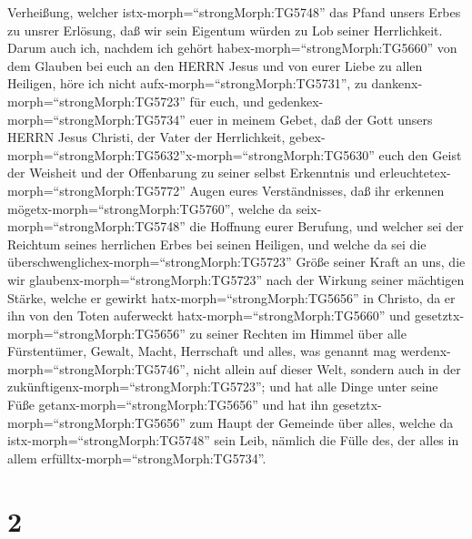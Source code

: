 Verheißung,  welcher istx-morph=``strongMorph:TG5748'' das
Pfand unsers Erbes zu unsrer Erlösung, daß wir sein Eigentum würden zu
Lob seiner Herrlichkeit.  Darum auch ich, nachdem ich
gehört habex-morph=``strongMorph:TG5660'' von dem Glauben bei euch an
den HERRN Jesus und von eurer Liebe zu allen Heiligen, 
höre ich nicht aufx-morph=``strongMorph:TG5731'', zu
dankenx-morph=``strongMorph:TG5723'' für euch, und
gedenkex-morph=``strongMorph:TG5734'' euer in meinem Gebet,
 daß der Gott unsers HERRN Jesus Christi, der Vater der
Herrlichkeit,
gebex-morph=``strongMorph:TG5632''\textbar x-morph=``strongMorph:TG5630''
euch den Geist der Weisheit und der Offenbarung zu seiner selbst
Erkenntnis  und erleuchtetex-morph=``strongMorph:TG5772''
Augen eures Verständnisses, daß ihr erkennen
mögetx-morph=``strongMorph:TG5760'', welche da
seix-morph=``strongMorph:TG5748'' die Hoffnung eurer Berufung, und
welcher sei der Reichtum seines herrlichen Erbes bei seinen Heiligen,
 und welche da sei die
überschwenglichex-morph=``strongMorph:TG5723'' Größe seiner Kraft an
uns, die wir glaubenx-morph=``strongMorph:TG5723'' nach der Wirkung
seiner mächtigen Stärke,  welche er gewirkt
hatx-morph=``strongMorph:TG5656'' in Christo, da er ihn von den Toten
auferweckt hatx-morph=``strongMorph:TG5660'' und
gesetztx-morph=``strongMorph:TG5656'' zu seiner Rechten im Himmel
 über alle Fürstentümer, Gewalt, Macht, Herrschaft und
alles, was genannt mag werdenx-morph=``strongMorph:TG5746'', nicht
allein auf dieser Welt, sondern auch in der
zukünftigenx-morph=``strongMorph:TG5723'';  und hat alle
Dinge unter seine Füße getanx-morph=``strongMorph:TG5656'' und hat ihn
gesetztx-morph=``strongMorph:TG5656'' zum Haupt der Gemeinde über alles,
 welche da istx-morph=``strongMorph:TG5748'' sein Leib,
nämlich die Fülle des, der alles in allem
erfülltx-morph=``strongMorph:TG5734''.

\hypertarget{section-1}{%
\section{2}\label{section-1}}

